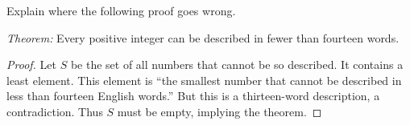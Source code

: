 \begin{problem}
Explain where the following proof goes wrong.

{\em Theorem:} Every positive integer can be described in fewer than
fourteen words.

\begin{proof}
  Let $S$ be the set of all numbers that cannot be so described. It
  contains a least element.  This element is ``the smallest number that
  cannot be described in less than fourteen English words.''  But this is
  a thirteen-word description, a contradiction.  Thus $S$ must be empty,
  implying the theorem.
\end{proof}

\begin{solution}
\end{solution}
\end{problem}

\endinput
